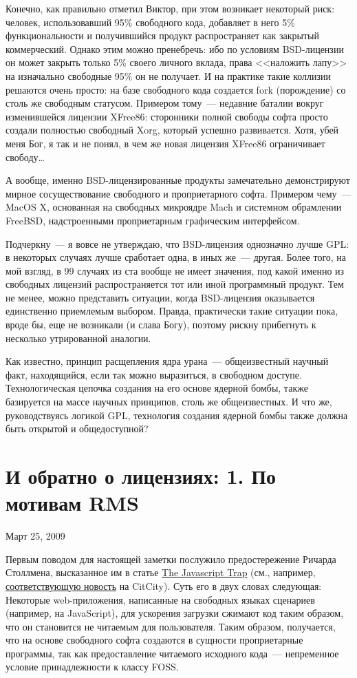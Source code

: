 Конечно, как правильно отметил Виктор, при этом возникает некоторый риск: человек, использовавший 95\% свободного кода, добавляет в него 5\% функциональности и получившийся продукт распространяет как закрытый коммерческий. Однако этим можно пренебречь: ибо по условиям BSD-лицензии он может закрыть только 5\% своего личного вклада, права <<наложить лапу>> на изначально свободные 95\% он не получает. И на практике такие коллизии решаются очень просто: на базе свободного кода создается fork (порождение) со столь же свободным статусом. Примером тому~--- недавние баталии вокруг изменившейся лицензии XFree86: сторонники полной свободы софта просто создали полностью свободный Xorg, который успешно развивается. Хотя, убей меня Бог, я так и не понял, в чем же новая лицензия XFree86 ограничивает свободу\dots

А вообще, именно BSD-лицензированные продукты замечательно демонстрируют мирное сосуществование свободного и проприетарного софта. Примером чему~--- MacOS X, основанная на свободных микроядре Mach и системном обрамлении FreeBSD, надстроенными проприетарным графическим интерфейсом.

Подчеркну~--- я вовсе не утверждаю, что BSD-лицензия однозначно лучше GPL: в некоторых случаях лучше сработает одна, в иных же~--- другая. Более того, на мой взгляд, в 99 случаях из ста вообще не имеет значения, под какой именно из свободных лицензий распространяется тот или иной программный продукт. Тем не менее, можно представить ситуации, когда BSD-лицензия оказывается единственно приемлемым выбором. Правда, практически такие ситуации пока, вроде бы, еще не возникали (и слава Богу), поэтому рискну прибегнуть к несколько утрированной аналогии.

Как известно, принцип расщепления ядра урана~--- общеизвестный научный факт, находящийся, если так можно выразиться, в свободном доступе. Технологическая цепочка создания на его основе ядерной бомбы, также базируется на массе научных принципов, столь же общеизвестных. И что же, руководствуясь логикой GPL, технология создания ядерной бомбы также должна быть открытой и общедоступной?

\section{И обратно о лицензиях: 1. По мотивам RMS} 
\begin{timeline}Март 25, 2009\end{timeline}
Первым поводом для настоящей заметки послужило предостережение Ричарда Столлмена, высказанное им в статье \href{http://www.gnu.org/philosophy/javascript-trap.html}{The Javascript Trap} (см., например, \href{http://citcity.ru/20806/}{соответствующую новость} на CitCity). Суть его в двух словах следующая: Некоторые web-приложения, написанные на свободных языках сценариев (например, на JavaScript), для ускорения загрузки сжимают код таким образом, что он становится не читаемым для пользователя. Таким образом, получается, что на основе свободного софта создаются в сущности проприетарные программы, так как предоставление читаемого исходного кода~--- непременное условие принадлежности к классу FOSS.

